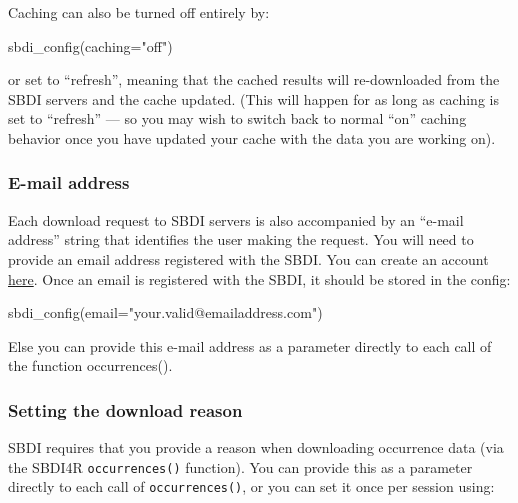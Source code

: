 \documentclass[
  10pt,
]{article}
\newenvironment{Shaded}{\begin{snugshade}}{\end{snugshade}}
\newcommand{\AttributeTok}[1]{\textcolor[rgb]{0.77,0.63,0.00}{#1}}
\newcommand{\FunctionTok}[1]{\textcolor[rgb]{0.00,0.00,0.00}{#1}}
\newcommand{\NormalTok}[1]{#1}
\newcommand{\StringTok}[1]{\textcolor[rgb]{0.31,0.60,0.02}{#1}}
\begin{document}
Caching can also be turned off entirely by:

\begin{Shaded}
\begin{Highlighting}[]
\FunctionTok{sbdi\_config}\NormalTok{(}\AttributeTok{caching=}\StringTok{"off"}\NormalTok{)}
\end{Highlighting}
\end{Shaded}

or set to ``refresh'', meaning that the cached results will re-downloaded
from the SBDI servers and the cache updated. (This will happen for as
long as caching is set to ``refresh'' --- so you may wish to switch back to
normal ``on'' caching behavior once you have updated your cache with the
data you are working on).

\hypertarget{e-mail-address}{%
\subsubsection*{E-mail address}\label{e-mail-address}}

Each download request to SBDI servers is also accompanied by an ``e-mail address''
string that identifies the user making the request. You will need to provide an
email address registered with the SBDI. You can create an account
\href{https://auth.biodiversitydata.se/cas/login}{here}. Once an email is registered
with the SBDI, it should be stored in the config:

\begin{Shaded}
\begin{Highlighting}[]
\FunctionTok{sbdi\_config}\NormalTok{(}\AttributeTok{email=}\StringTok{"your.valid@emailaddress.com"}\NormalTok{)}
\end{Highlighting}
\end{Shaded}

Else you can provide this e-mail address as a parameter directly to
each call of the function occurrences().

\hypertarget{setting-the-download-reason}{%
\subsubsection*{Setting the download reason}\label{setting-the-download-reason}}

SBDI requires that you provide a reason when downloading occurrence data
(via the SBDI4R \texttt{occurrences()} function). You can provide this as a
parameter directly to each call of \texttt{occurrences()}, or you can set it
once per session using:
\end{document}

